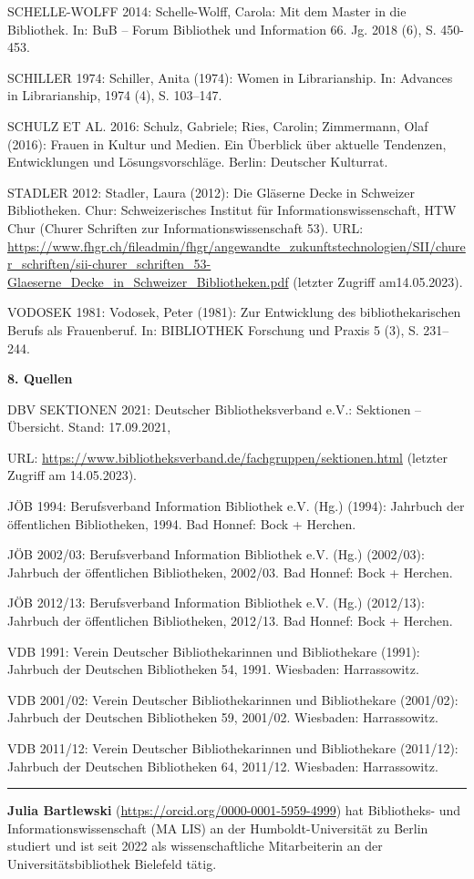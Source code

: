 \documentclass[a4paper,
fontsize=11pt,
oneside,
numbers=noperiodatend,
parskip=half-,
bibliography=totoc,
final
]{scrartcl}
\begin{document}
SCHELLE-WOLFF 2014: Schelle-Wolff, Carola: Mit dem Master in die
Bibliothek. In: BuB -- Forum Bibliothek und Information 66. Jg. 2018
(6), S. 450-453.

SCHILLER 1974: Schiller, Anita (1974): Women in Librarianship. In:
Advances in Librarianship, 1974 (4), S. 103--147.

SCHULZ ET AL. 2016: Schulz, Gabriele; Ries, Carolin; Zimmermann, Olaf
(2016): Frauen in Kultur und Medien. Ein Überblick über aktuelle
Tendenzen, Entwicklungen und Lösungsvorschläge. Berlin: Deutscher
Kulturrat.

STADLER 2012: Stadler, Laura (2012): Die Gläserne Decke in Schweizer
Bibliotheken. Chur: Schweizerisches Institut für
Informationswissenschaft, HTW Chur (Churer Schriften zur
Informationswissenschaft 53). URL:
\url{https://www.fhgr.ch/fileadmin/fhgr/angewandte_zukunftstechnologien/SII/churer_schriften/sii-churer_schriften_53-Glaeserne_Decke_in_Schweizer_Bibliotheken.pdf}
(letzter Zugriff am14.05.2023).

VODOSEK 1981: Vodosek, Peter (1981): Zur Entwicklung des
bibliothekarischen Berufs als Frauenberuf. In: BIBLIOTHEK Forschung und
Praxis 5 (3), S. 231--244.

\textbf{8. Quellen}

DBV SEKTIONEN 2021: Deutscher Bibliotheksverband e.V.: Sektionen --
Übersicht. Stand: 17.09.2021,

URL: \url{https://www.bibliotheksverband.de/fachgruppen/sektionen.html}
(letzter Zugriff am 14.05.2023).

JÖB 1994: Berufsverband Information Bibliothek e.V. (Hg.) (1994):
Jahrbuch der öffentlichen Bibliotheken, 1994. Bad Honnef: Bock +
Herchen.

JÖB 2002/03: Berufsverband Information Bibliothek e.V. (Hg.) (2002/03):
Jahrbuch der öffentlichen Bibliotheken, 2002/03. Bad Honnef: Bock +
Herchen.

JÖB 2012/13: Berufsverband Information Bibliothek e.V. (Hg.) (2012/13):
Jahrbuch der öffentlichen Bibliotheken, 2012/13. Bad Honnef: Bock +
Herchen.

VDB 1991: Verein Deutscher Bibliothekarinnen und Bibliothekare (1991):
Jahrbuch der Deutschen Bibliotheken 54, 1991. Wiesbaden: Harrassowitz.

VDB 2001/02: Verein Deutscher Bibliothekarinnen und Bibliothekare
(2001/02): Jahrbuch der Deutschen Bibliotheken 59, 2001/02. Wiesbaden:
Harrassowitz.

VDB 2011/12: Verein Deutscher Bibliothekarinnen und Bibliothekare
(2011/12): Jahrbuch der Deutschen Bibliotheken 64, 2011/12. Wiesbaden:
Harrassowitz.

\begin{center}\rule{0.5\linewidth}{0.5pt}\end{center}

\textbf{Julia Bartlewski} (\url{https://orcid.org/0000-0001-5959-4999})
hat Bibliotheks- und Informationswissenschaft (MA LIS) an der
Humboldt-Universität zu Berlin studiert und ist seit 2022 als
wissenschaftliche Mitarbeiterin an der Universitätsbibliothek Bielefeld
tätig.
\end{document}
